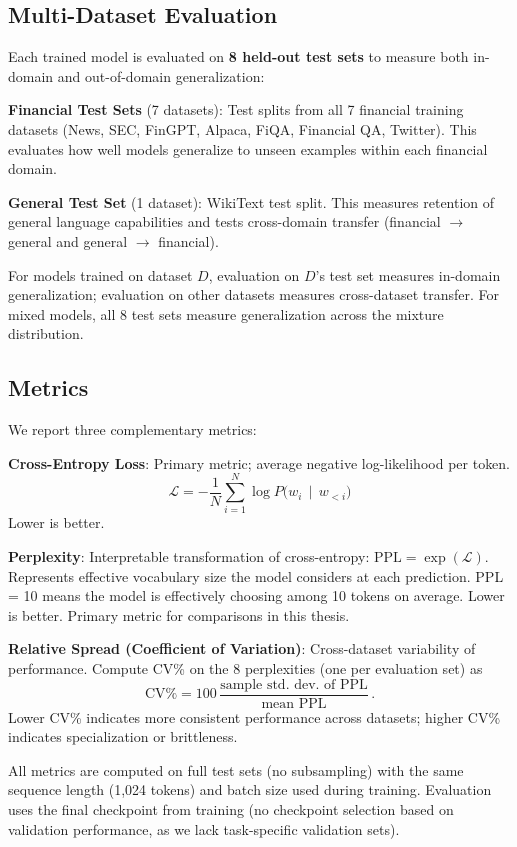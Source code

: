 \subsection{Multi-Dataset Evaluation}

Each trained model is evaluated on \textbf{8 held-out test sets} to measure both in-domain and out-of-domain generalization:

\textbf{Financial Test Sets} (7 datasets): Test splits from all 7 financial training datasets (News, SEC, FinGPT, Alpaca, FiQA, Financial QA, Twitter). This evaluates how well models generalize to unseen examples within each financial domain.

\textbf{General Test Set} (1 dataset): WikiText test split. This measures retention of general language capabilities and tests cross-domain transfer (financial $\to$ general and general $\to$ financial).

For models trained on dataset $D$, evaluation on $D$'s test set measures in-domain generalization; evaluation on other datasets measures cross-dataset transfer. For mixed models, all 8 test sets measure generalization across the mixture distribution.

\subsection{Metrics}

We report three complementary metrics:

\textbf{Cross-Entropy Loss}: Primary metric; average negative log-likelihood per token.
\begin{equation*}
    \mathcal{L} = -\frac{1}{N}\sum_{i=1}^{N} \log P\bigl(w_i \,\mid\, w_{<i}\bigr)
\end{equation*}
Lower is better.

\textbf{Perplexity}: Interpretable transformation of cross-entropy: $\text{PPL} = \exp(\mathcal{L})$. Represents effective vocabulary size the model considers at each prediction. PPL = 10 means the model is effectively choosing among 10 tokens on average. Lower is better. Primary metric for comparisons in this thesis.

\textbf{Relative Spread (Coefficient of Variation)}: Cross-dataset variability of performance. Compute CV\% on the 8 perplexities (one per evaluation set) as
\begin{equation*}
    \text{CV}\% = 100\,\frac{\text{sample std. dev. of PPL}}{\text{mean PPL}}\, .
\end{equation*}
Lower CV\% indicates more consistent performance across datasets; higher CV\% indicates specialization or brittleness.

All metrics are computed on full test sets (no subsampling) with the same sequence length (1,024 tokens) and batch size used during training. Evaluation uses the final checkpoint from training (no checkpoint selection based on validation performance, as we lack task-specific validation sets).
